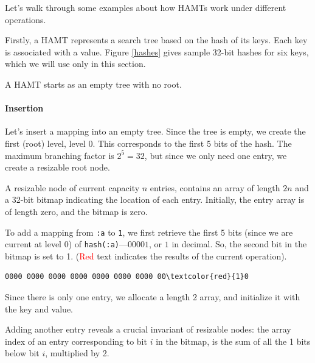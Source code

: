 \documentclass[preprint]{sigplanconf}
\begin{document}
Let's walk through some examples about how HAMTs
work under different operations.

Firstly, a HAMT represents a search tree
based on the hash of its keys.
Each key is associated with a value.
Figure \ref{hashes} gives sample 32-bit hashes for six keys,
which we will use only in this section.

A HAMT starts as an empty tree with no root.

\paragraph{Insertion}
Let's insert a mapping into an empty tree.
Since the tree is empty, we create the
first (root) level, level 0. This corresponds
to the first 5 bits of the hash. The maximum
branching factor is $2^5=32$, but since we
only need one entry, we create a resizable
root node.

A resizable node of current capacity $n$ entries,
contains an array of length $2n$ and a 32-bit
bitmap indicating the location of each entry.
Initially, the entry array is of length zero, and the bitmap
is zero.

To add a mapping from
\texttt{:a} to \texttt{1}, we first retrieve
the first 5 bits (since we are current at level 0)
of \texttt{hash(:a)}---$00001$, or $1$
in decimal. So, the second bit in the bitmap
is set to 1. (\textcolor{red}{Red} text indicates the results of the
current operation).

\begin{Verbatim}[commandchars=\\\{\},codes={\catcode`$=3\catcode`^=7\catcode`_=8}]
0000 0000 0000 0000 0000 0000 0000 00\textcolor{red}{1}0
\end{Verbatim}


Since there is only one entry, we allocate a length 2 array,
and initialize it with the key and value.

Adding another entry reveals a crucial invariant
of resizable nodes: the array index of an entry
corresponding to bit $i$ in the bitmap,
is the sum of all the 1 bits below bit $i$,
multiplied by 2.
\end{document}
